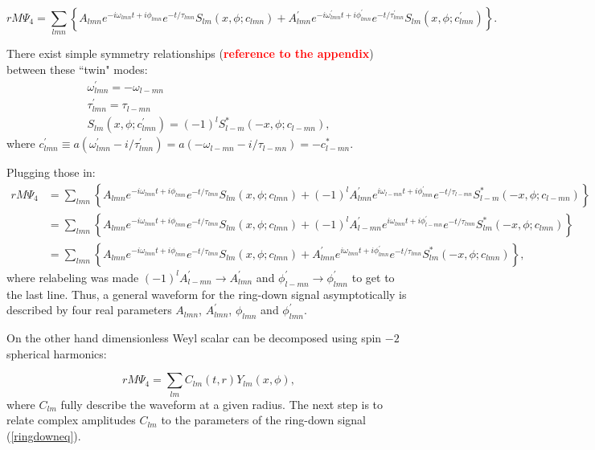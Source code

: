\documentclass[11pt]{article}
\begin{document}
\begin{equation}
rM\Psi_4 = \sum_{lmn} \left\{ A_{lmn} e^{-i\omega_{lmn}t+i\phi_{lmn}}e^{-t/\tau_{lmn}} S_{lm}(x,\phi ; c_{lmn}) + A^{'}_{lmn} e^{-i\omega^{'}_{lmn}t+i\phi^{'}_{lmn}}e^{-t/\tau^{'}_{lmn}} S_{lm}(x,\phi ; c^{'}_{lmn}) \right\}.
\end{equation}

\noindent
There exist simple symmetry relationships (\textcolor{red}{\bf reference to the appendix}) between these ``twin" modes:
\begin{equation}
\begin{array}{l}
\omega^{'}_{lmn} = -\omega_{l-mn} \\
\tau^{'}_{lmn} = \tau_{l-mn} \\
S_{lm}(x,\phi ;c^{'}_{lmn}) = (-1)^l S^{*}_{l-m}(-x,\phi; c_{l-mn}),
\end{array} 
\end{equation}
where $c^{'}_{lmn} \equiv a( \omega^{'}_{lmn} - i/\tau^{'}_{lmn} ) = a( -\omega_{l-mn} - i/\tau_{l-mn} ) = - c^{*}_{l-mn}$.

\noindent
Plugging those in:
\begin{align} \label{ringdowneq}
\nonumber rM\Psi_4 &= \sum_{lmn} \left\{ A_{lmn} e^{-i\omega_{lmn}t+i\phi_{lmn}}e^{-t/\tau_{lmn}} S_{lm}(x,\phi; c_{lmn}) +  (-1)^l A^{'}_{lmn} e^{i\omega_{l-mn}t+i\phi^{'}_{lmn}}e^{-t/\tau_{l-mn}}S^{*}_{l-m}(-x,\phi; c_{l-mn}) \right\}\\
\nonumber 	 	   &=\sum_{lmn} \left\{ A_{lmn} e^{-i\omega_{lmn}t+i\phi_{lmn}}e^{-t/\tau_{lmn}} S_{lm}(x, \phi ;c_{lmn}) +  (-1)^l A^{'}_{l-mn} e^{i\omega_{lmn}t+i\phi^{'}_{l-mn}}e^{-t/\tau_{lmn}} S^{*}_{lm}(-x, \phi; c_{lmn}) \right\}\\
				   &=\sum_{lmn} \left\{ A_{lmn} e^{-i\omega_{lmn}t+i\phi_{lmn}}e^{-t/\tau_{lmn}} S_{lm}(x, \phi ;c_{lmn}) +  A^{'}_{lmn} e^{i\omega_{lmn}t+i\phi^{'}_{lmn}}e^{-t/\tau_{lmn}} S^{*}_{lm 	}(-x, \phi; c_{lmn}) \right\},
\end{align}
where relabeling was made $(-1)^l A^{'}_{l-mn} \rightarrow A^{'}_{lmn}$ and $\phi^{'}_{l-mn} \rightarrow \phi^{'}_{lmn}$ to get to the last line. Thus, a general waveform for the ring-down signal asymptotically is described by four real parameters $A_{lmn}$, $A^{'}_{lmn}$, $\phi_{lmn}$ and $\phi^{'}_{lmn}$.

On the other hand dimensionless Weyl scalar can be decomposed using spin $-2$ spherical harmonics:

\begin{equation}
rM\Psi_4 = \sum_{lm} C_{lm}(t,r) Y_{lm}(x, \phi),
\end{equation} 
where $C_{lm}$ fully describe the waveform at a given radius. The next step is to relate complex amplitudes $C_{lm}$ to the parameters of the ring-down signal (\ref{ringdowneq}). 
\end{document}

